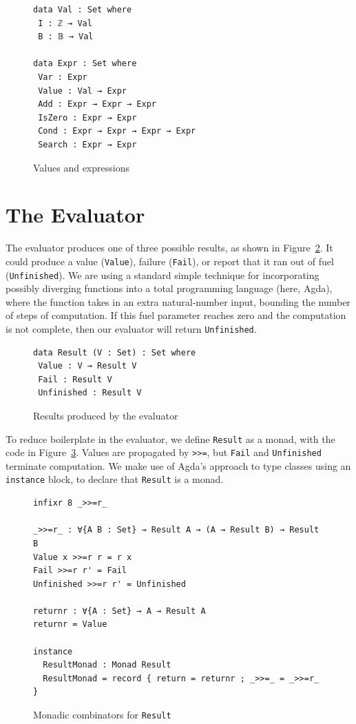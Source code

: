 \documentclass[acmsmall,screen,review]{acmart}
\begin{document}
\begin{figure}
\begin{verbatim}
data Val : Set where
 I : ℤ → Val
 B : 𝔹 → Val

data Expr : Set where
 Var : Expr
 Value : Val → Expr
 Add : Expr → Expr → Expr
 IsZero : Expr → Expr
 Cond : Expr → Expr → Expr → Expr
 Search : Expr → Expr
\end{verbatim}
\caption{Values and expressions}
\label{fig:syn}
\end{figure}

\section{The Evaluator}

The evaluator produces one of three possible results, as shown in
Figure~\ref{fig:res}.  It could produce a value (\verb|Value|),
failure (\verb|Fail|), or report that it ran out of fuel
(\verb|Unfinished|).  We are using a standard simple technique for
incorporating possibly diverging functions into a total programming
language (here, Agda), where the function takes in an extra
natural-number input, bounding the number of steps of computation.  If
this fuel parameter reaches zero and the computation is not complete,
then our evaluator will return \verb|Unfinished|.

\begin{figure}
\begin{verbatim}
data Result (V : Set) : Set where
 Value : V → Result V
 Fail : Result V
 Unfinished : Result V
\end{verbatim}
\caption{Results produced by the evaluator}
\label{fig:res}
\end{figure}

To reduce boilerplate in the evaluator, we define \verb|Result| as a monad, with the code in Figure~\ref{fig:resmon}.
Values are propagated by \verb|>>=|, but \verb|Fail| and \verb|Unfinished| terminate computation.  We make use of
Agda's approach to type classes using an \verb|instance| block, to declare that \verb|Result| is a monad.  

\begin{figure}
\begin{verbatim}
infixr 8 _>>=r_

_>>=r_ : ∀{A B : Set} → Result A → (A → Result B) → Result B
Value x >>=r r = r x 
Fail >>=r r' = Fail
Unfinished >>=r r' = Unfinished

returnr : ∀{A : Set} → A → Result A
returnr = Value

instance
  ResultMonad : Monad Result 
  ResultMonad = record { return = returnr ; _>>=_ = _>>=r_ }
\end{verbatim}
\caption{Monadic combinators for \texttt{Result}}
\label{fig:resmon}
\end{figure}
\end{document}
